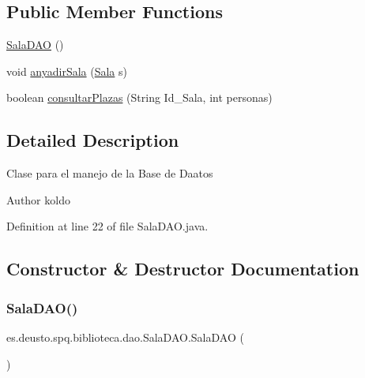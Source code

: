 \subsection*{Public Member Functions}
\begin{DoxyCompactItemize}
\item 
\mbox{\hyperlink{classes_1_1deusto_1_1spq_1_1biblioteca_1_1dao_1_1_sala_d_a_o_ab7f0df9b8c8164008abb22df95c72a4b}{Sala\+D\+AO}} ()
\item 
void \mbox{\hyperlink{classes_1_1deusto_1_1spq_1_1biblioteca_1_1dao_1_1_sala_d_a_o_ab057300f33df6ae974e6e949900b1dc7}{anyadir\+Sala}} (\mbox{\hyperlink{classes_1_1deusto_1_1spq_1_1biblioteca_1_1data_1_1_sala}{Sala}} s)
\item 
boolean \mbox{\hyperlink{classes_1_1deusto_1_1spq_1_1biblioteca_1_1dao_1_1_sala_d_a_o_a3095e0681af1d32bd5706ca6941e0784}{consultar\+Plazas}} (String Id\+\_\+\+Sala, int personas)
\end{DoxyCompactItemize}


\subsection{Detailed Description}
Clase para el manejo de la Base de Daatos \begin{DoxyAuthor}{Author}
koldo 
\end{DoxyAuthor}


Definition at line 22 of file Sala\+D\+A\+O.\+java.



\subsection{Constructor \& Destructor Documentation}
\mbox{\label{classes_1_1deusto_1_1spq_1_1biblioteca_1_1dao_1_1_sala_d_a_o_ab7f0df9b8c8164008abb22df95c72a4b}} 
\subsubsection{\texorpdfstring{Sala\+D\+A\+O()}{SalaDAO()}}
{\footnotesize\ttfamily es.\+deusto.\+spq.\+biblioteca.\+dao.\+Sala\+D\+A\+O.\+Sala\+D\+AO (\begin{DoxyParamCaption}{ }\end{DoxyParamCaption})}

